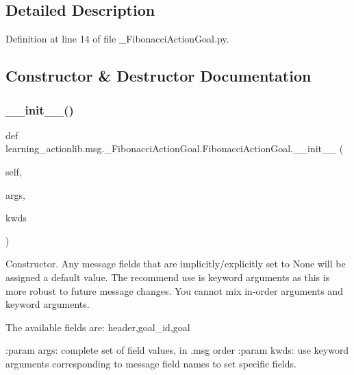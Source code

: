 \subsection{Detailed Description}


Definition at line 14 of file \+\_\+\+Fibonacci\+Action\+Goal.\+py.



\subsection{Constructor \& Destructor Documentation}
\mbox{\label{classlearning__actionlib_1_1msg_1_1__FibonacciActionGoal_1_1FibonacciActionGoal_a879da4c79c23551f5dae036f0362f57d}} 
\subsubsection{\texorpdfstring{\+\_\+\+\_\+init\+\_\+\+\_\+()}{\_\_init\_\_()}}
{\footnotesize\ttfamily def learning\+\_\+actionlib.\+msg.\+\_\+\+Fibonacci\+Action\+Goal.\+Fibonacci\+Action\+Goal.\+\_\+\+\_\+init\+\_\+\+\_\+ (\begin{DoxyParamCaption}\item[{}]{self,  }\item[{}]{args,  }\item[{}]{kwds }\end{DoxyParamCaption})}

\begin{DoxyVerb}Constructor. Any message fields that are implicitly/explicitly
set to None will be assigned a default value. The recommend
use is keyword arguments as this is more robust to future message
changes.  You cannot mix in-order arguments and keyword arguments.

The available fields are:
   header,goal_id,goal

:param args: complete set of field values, in .msg order
:param kwds: use keyword arguments corresponding to message field names
to set specific fields.
\end{DoxyVerb}
 

